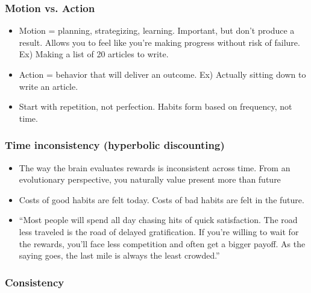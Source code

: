 \begin{frame}[fragile]\frametitle{Motion vs. Action}
\begin{itemize}
\item Motion = planning, strategizing, learning. Important, but don’t produce a result. Allows you to feel like you’re making progress without risk of failure. Ex) Making a list of 20 articles to write. 
\item Action = behavior that will deliver an outcome. Ex) Actually sitting down to write an article. 
\item Start with repetition, not perfection. Habits form based on frequency, not time. 
\end{itemize}
\end{frame}



\begin{frame}[fragile]\frametitle{Time inconsistency (hyperbolic discounting)}
\begin{itemize}
\item The way the brain evaluates rewards is inconsistent across time. From an evolutionary perspective, you naturally value present more than future 
\item Costs of good habits are felt today. Costs of bad habits are felt in the future. 
\item 
``Most people will spend all day chasing hits of quick satisfaction. The road less traveled is the road of delayed gratification. If you’re willing to wait for the rewards, you’ll face less competition and often get a bigger payoff. As the saying goes, the last mile is always the least crowded.'' 
\end{itemize}
\end{frame}

\begin{frame}[fragile]\frametitle{Consistency}
\end{frame}

